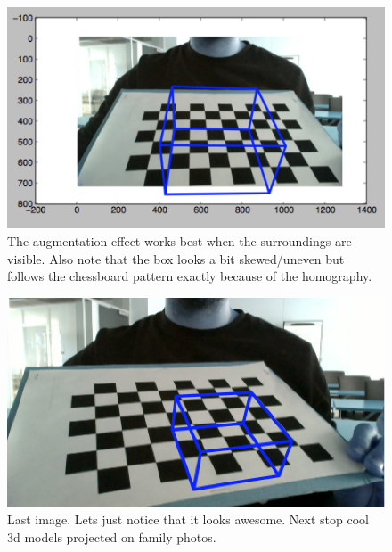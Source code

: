 \begin{figure}[H]
\center
\includegraphics{pics/result4.png}
\caption{The augmentation effect works best when the surroundings are visible. Also note that the box looks a bit skewed/uneven but follows the chessboard pattern exactly because of the homography.}
\label{result4}
\end{figure}

\begin{figure}[H]
\center
\includegraphics{pics/result5.png}
\caption{Last image. Lets just notice that it looks awesome. Next stop cool 3d models projected on family photos.}
\label{result5}
\end{figure}
